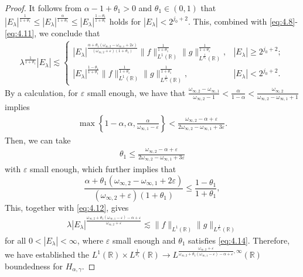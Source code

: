 \documentclass[10pt,a4paper]{amsart}
\begin{document}
\begin{proof}
It follows from $\alpha-1+\theta_{1}>0$ and $\theta_1\in (0,1)$ that
$ |E_\lambda|^{{\frac{1}{1+\theta_{1}}}}\leq |E_\lambda|^{\frac{\alpha}{1+\theta_{1}}}\leq |E_\lambda|^{\frac{1-\theta_{1}}{1+\theta_{1}}}$
holds for $|E_{\lambda}|<2^{j_0+2}$. This, combined with \eqref{eq:4.8}-\eqref{eq:4.11}, we conclude that
\begin{align}\label{eq:4.12}
\lambda^{\frac{1}{1+\theta_{1}}}|E_{\lambda}|\lesssim
\begin{cases}
   |E_\lambda|^{\frac{\alpha+\theta_1(\omega_{\infty,2}-\omega_{\infty,1}+2\varepsilon)}{(\omega_{\infty,2}+\varepsilon)(1+\theta_{1})}}
 \|f\|_{L^{1}(\mathbb{R})}^{\frac{1}{1+\theta_{1}}}\|g\|_{L^{\frac{1}{\theta_1}}(\mathbb{R})}^{\frac{1}{1+\theta_{1}}}, & |E_\lambda|\geq2^{j_0+2}; \\
 |E_\lambda|^{\frac{1-\theta_{1}}{1+\theta_{1}}}
\|f\|_{L^{1}(\mathbb{R})}^{\frac{1}{1+\theta_{1}}}\|g\|_{L^{\frac{1}{\theta_1}}(\mathbb{R})}^{\frac{1}{1+\theta_{1}}}, &|E_{\lambda}|<2^{j_0+2}.
\end{cases}
\end{align}
By a calculation, for $\varepsilon$ small enough, we have that $\frac{\omega_{\infty,2}-\omega_{\infty,1}}{\omega_{\infty,2}-1}<\frac{\alpha}{1-\alpha}<\frac{\omega_{\infty,2}}{\omega_{\infty,2}-\omega_{\infty,1}+1}$ implies
\begin{align}\label{eq:4.13}
\max\left\{1-\alpha, \alpha, \frac{\alpha}{\omega_{\infty,1}-\varepsilon}\right\}<\frac{\omega_{\infty,2}-\alpha+\varepsilon}{2\omega_{\infty,2}-\omega_{\infty,1}+3\varepsilon}.
\end{align}
Then, we can take
\begin{align}\label{eq:4.14}
\theta_1\leq \frac{\omega_{\infty,2}-\alpha+\varepsilon}{2\omega_{\infty,2}-\omega_{\infty,1}+3\varepsilon}
\end{align}
with $\varepsilon$ small enough, which further implies that
$$\frac{\alpha+\theta_1(\omega_{\infty,2}-\omega_{\infty,1}+2\varepsilon)}{(\omega_{\infty,2}+\varepsilon)(1+\theta_{1})}\leq \frac{1-\theta_{1}}{1+\theta_{1}},$$
This, together with \eqref{eq:4.12}, gives
\begin{align}\label{eq:4.15}
\lambda|E_{\lambda}|^{\frac{\omega_{\infty,2}+ \theta_1(\omega_{\infty,1}-\varepsilon)-\alpha+\varepsilon}{\omega_{\infty,2}+\varepsilon}}\lesssim \|f\|_{L^{1}(\mathbb{R})}\|g\|_{L^{\frac{1}{\theta_1}}(\mathbb{R})}
\end{align}
for all $0<|E_\lambda|<\infty$, where $\varepsilon$ small enough and $\theta_1$ satisfies \eqref{eq:4.14}. Therefore, we have established the $L^{1}(\mathbb{R})\times L^{\frac{1}{\theta_{1}}}(\mathbb{R})\rightarrow L^{\frac{\omega_{\infty,2}+\varepsilon}{\omega_{\infty,2}+ \theta_1(\omega_{\infty,1}-\varepsilon)-\alpha+\varepsilon}, \infty}(\mathbb{R})$ boundedness for $H_{\alpha,\gamma}$.


\end{proof}
\end{document}
